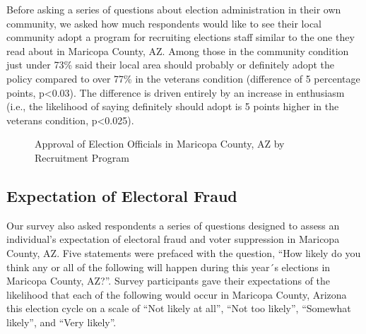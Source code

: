 \documentclass[
  11pt,
  a4paper,
]{article}
\begin{document}
Before asking a series of questions about election administration in
their own community, we asked how much respondents would like to see
their local community adopt a program for recruiting elections staff
similar to the one they read about in Maricopa County, AZ. Among those
in the community condition just under 73\% said their local area should
probably or definitely adopt the policy compared to over 77\% in the
veterans condition (difference of 5 percentage points, p\textless0.03).
The difference is driven entirely by an increase in enthusiasm (i.e.,
the likelihood of saying definitely should adopt is 5 points higher in
the veterans condition, p\textless0.025).

\begin{figure}

\caption{\label{fig-q29-likert}Approval of Election Officials in
Maricopa County, AZ by Recruitment Program}


\end{figure}%

\newpage{}

\subsection{Expectation of Electoral
Fraud}\label{expectation-of-electoral-fraud}

Our survey also asked respondents a series of questions designed to
assess an individual's expectation of electoral fraud and voter
suppression in Maricopa County, AZ. Five statements were prefaced with
the question, ``How likely do you think any or all of the following will
happen during this year´s elections in Maricopa County, AZ?''. Survey
participants gave their expectations of the likelihood that each of the
following would occur in Maricopa County, Arizona this election cycle on
a scale of ``Not likely at all'', ``Not too likely'', ``Somewhat
likely'', and ``Very likely''.
\end{document}
